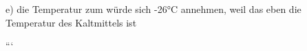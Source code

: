 e) \quad die Temperatur zum würde sich -26°C annehmen, weil das eben die Temperatur des Kaltmittels ist

```